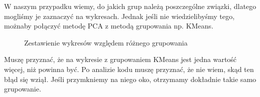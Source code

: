\documentclass[12pt, a4paper]{article}
\begin{document}
    W naszym przypadku wiemy, do jakich grup należą poszczególne związki, dlatego mogliśmy je zaznaczyć na wykresach.
    Jednak jeśli nie wiedzielibyśmy tego, możnaby połączyć metodę PCA z metodą grupowania np. KMeans. 

    \begin{figure}
        \centering
        \qquad
        \caption{Zestawienie wykresów względem różnego grupowania}
    \end{figure}

    Muszę przyznać, że na wykresie z grupowaniem KMeans jest jedna wartość więcej, niż powinna być.
    Po analizie kodu muszę przyznać, że nie wiem, skąd ten błąd się wziął. Jeśli przymkniemy na niego oko,
    otrzymamy dokładnie takie samo grupowanie.
\end{document}
